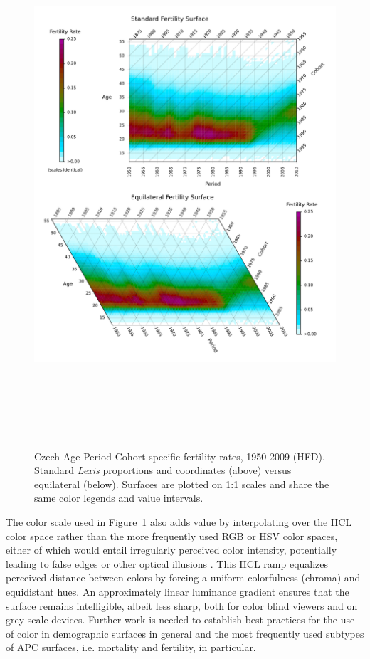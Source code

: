 \documentclass[a4paper]{article}
\begin{document}
\begin{figure}[H]
\centering
\includegraphics[width=16.5cm,height=19.5cm]{Figs/Figure2HCLd.pdf}
\caption{Czech Age-Period-Cohort specific fertility rates, 1950-2009 (HFD). Standard \textit{Lexis} proportions and coordinates (above) versus equilateral (below). Surfaces are plotted on 1:1 scales and share the same color legends and value intervals.}
\label{Fig2}
\end{figure}
 
The color scale used in Figure~\ref{Fig2} also adds value by interpolating over the HCL color space \citep{ihaka2003colour, colorspace2011} rather than the more frequently used RGB or HSV color spaces, either of which would entail irregularly perceived color intensity, potentially leading to false edges or other optical illusions \citep{zeileis2009escaping}. This HCL ramp equalizes perceived distance between colors by forcing a uniform colorfulness (chroma) and equidistant hues. An approximately linear luminance gradient ensures that the surface remains intelligible, albeit less sharp, both for color blind viewers and on grey scale devices. Further work is needed to establish best practices for the use of color in demographic surfaces in general and the most frequently used subtypes of APC surfaces, i.e. mortality and fertility, in particular.
\end{document}

